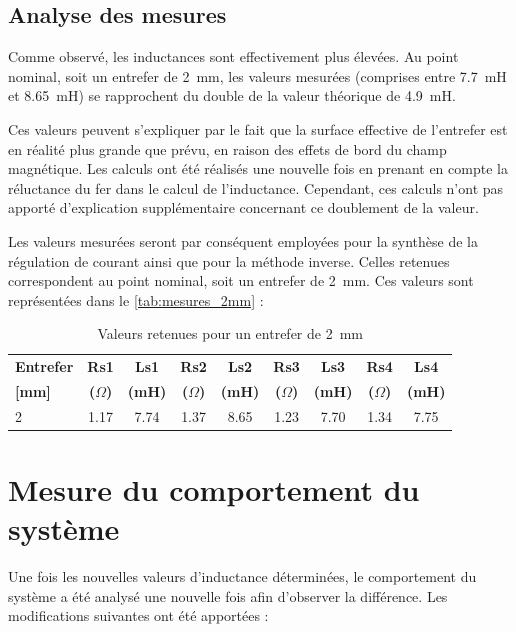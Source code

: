 \subsection{Analyse des mesures}
Comme observé, les inductances sont effectivement plus élevées. Au point nominal, soit un entrefer de 2~mm, les valeurs mesurées (comprises entre 7.7~mH et 8.65~mH) se rapprochent du double de la valeur théorique de 4.9~mH.

Ces valeurs peuvent s'expliquer par le fait que la surface effective de l'entrefer est en réalité plus grande que prévu, en raison des effets de bord du champ magnétique. Les calculs ont été réalisés une nouvelle fois en prenant en compte la réluctance du fer dans le calcul de l'inductance. Cependant, ces calculs n'ont pas apporté d'explication supplémentaire concernant ce doublement de la valeur.

Les valeurs mesurées seront par conséquent employées pour la synthèse de la régulation de courant ainsi que pour la méthode inverse. Celles retenues correspondent au point nominal, soit un entrefer de 2~mm. Ces valeurs sont représentées dans le \autoref{tab:mesures_2mm} :

\begin{table}[H]
    \centering
    \begin{tabular}{l ccc ccc cc}
        \toprule
        \textbf{Entrefer} & \textbf{Rs1}        & \textbf{Ls1}  & \textbf{Rs2}        & \textbf{Ls2}  & \textbf{Rs3}        & \textbf{Ls3}  & \textbf{Rs4}        & \textbf{Ls4}  \\
        \textbf{[mm]}     & \textbf{($\Omega$)} & \textbf{(mH)} & \textbf{($\Omega$)} & \textbf{(mH)} & \textbf{($\Omega$)} & \textbf{(mH)} & \textbf{($\Omega$)} & \textbf{(mH)} \\
        \midrule
        2                 & 1.17                & 7.74          & 1.37                & 8.65          & 1.23                & 7.70          & 1.34                & 7.75          \\
        \bottomrule
    \end{tabular}
    \caption{Valeurs retenues pour un entrefer de 2~mm}
    \label{tab:mesures_2mm}
\end{table}

\section{Mesure du comportement du système}
Une fois les nouvelles valeurs d'inductance déterminées, le comportement du système a été analysé une nouvelle fois afin d'observer la différence. Les modifications suivantes ont été apportées :

